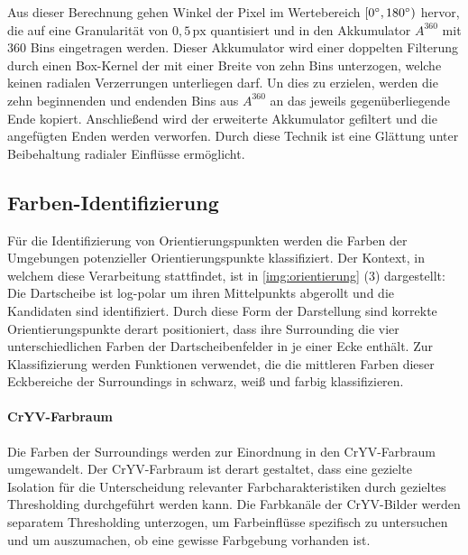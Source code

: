 Aus dieser Berechnung gehen Winkel der Pixel im Wertebereich $[0^{\circ}, 180^{\circ})$ hervor, die auf eine Granularität von $0,5\,\text{px}$ quantisiert und in den Akkumulator $A^{360}$ mit $360$ Bins eingetragen werden. Dieser Akkumulator wird einer doppelten Filterung durch einen Box-Kernel der mit einer Breite von zehn Bins unterzogen, welche keinen radialen Verzerrungen unterliegen darf. Un dies zu erzielen, werden die zehn beginnenden und endenden Bins aus $A^{360}$ an das jeweils gegenüberliegende Ende kopiert. Anschließend wird der erweiterte Akkumulator gefiltert und die angefügten Enden werden verworfen. Durch diese Technik ist eine Glättung unter Beibehaltung radialer Einflüsse ermöglicht.



\vspace*{-0.1cm}
\subsection{Farben-Identifizierung}
\label{sec:farbidentifizierung_impl}

Für die Identifizierung von Orientierungspunkten werden die Farben der Umgebungen potenzieller Orientierungspunkte klassifiziert. Der Kontext, in welchem diese Verarbeitung stattfindet, ist in \autoref{img:orientierung} (3) dargestellt: Die Dartscheibe ist log-polar um ihren Mittelpunkts abgerollt und die Kandidaten sind identifiziert. Durch diese Form der Darstellung sind korrekte Orientierungspunkte derart positioniert, dass ihre Surrounding die vier unterschiedlichen Farben der Dartscheibenfelder in je einer Ecke enthält. Zur Klassifizierung werden Funktionen verwendet, die die mittleren Farben dieser Eckbereiche der Surroundings in schwarz, weiß und farbig klassifizieren.

\vspace*{-0.1cm}
\paragraph{CrYV-Farbraum}

Die Farben der Surroundings werden zur Einordnung in den CrYV-Farbraum umgewandelt. Der CrYV-Farbraum ist derart gestaltet, dass eine gezielte Isolation für die Unterscheidung relevanter Farbcharakteristiken durch gezieltes Thresholding durchgeführt werden kann. Die Farbkanäle der CrYV-Bilder werden separatem Thresholding unterzogen, um Farbeinflüsse spezifisch zu untersuchen und um auszumachen, ob eine gewisse Farbgebung vorhanden ist.

